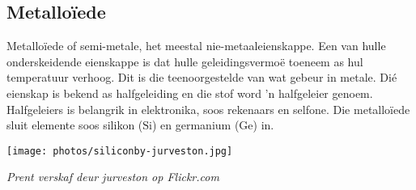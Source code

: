            \subsection*{Metallo\"iede}
            \nopagebreak
\begin{minipage}{.5\textwidth}
        \label{m38708*id66042}Metalloïede of semi-metale, het meestal nie-metaaleienskappe. Een van hulle onderskeidende eienskappe is dat hulle geleidingsvermoë toeneem as hul temperatuur verhoog. Dit is die teenoorgestelde van wat gebeur in metale.  Di\'e eienskap is bekend as halfgeleiding en die stof word  'n halfgeleier genoem. Halfgeleiers is belangrik in elektronika, soos rekenaars en selfone. Die metallo\"iede sluit elemente soos silikon ($\text{Si}$) en germanium ($\text{Ge}$) in.\par 
\end{minipage}
\begin{minipage}{.5\textwidth}
\begin{center}
 \texttt{[image: photos/siliconby-jurveston.jpg]}\par
\textit{Prent verskaf deur jurveston op Flickr.com}
\end{center}
\end{minipage}
\par 
      \noindent

